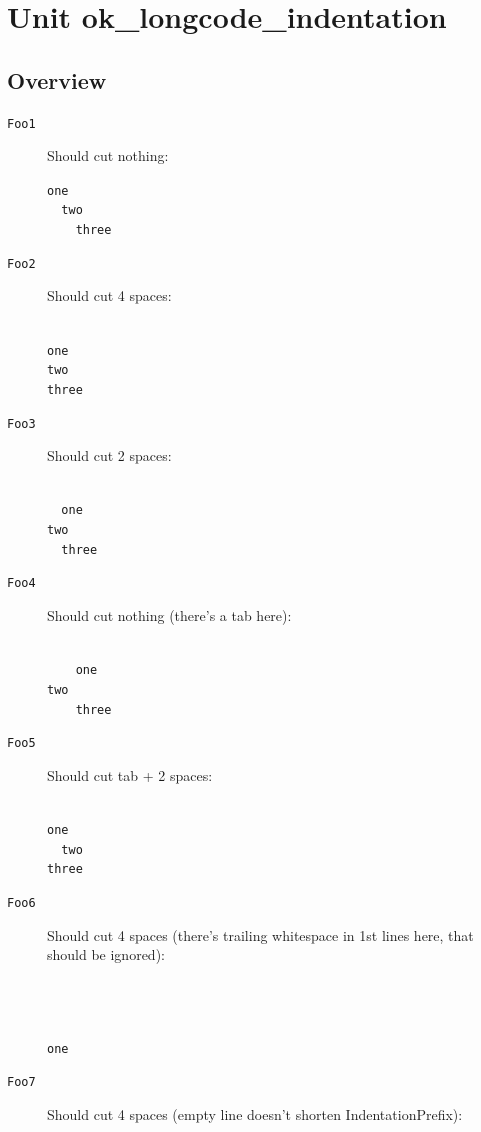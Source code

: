 \documentclass{report}
\begin{document}
\newlength{\tmplength}
\chapter{Unit ok{\_}longcode{\_}indentation}
\section{Overview}
\begin{description}
\item[\texttt{Foo1}]Should cut nothing:

\texttt{one\\\nopagebreak[3]
~~two\\\nopagebreak[3]
~~~~three\\
}
\item[\texttt{Foo2}]Should cut 4 spaces:

\texttt{\\\nopagebreak[3]
one\\\nopagebreak[3]
two\\\nopagebreak[3]
three\\
}
\item[\texttt{Foo3}]Should cut 2 spaces:

\texttt{\\\nopagebreak[3]
~~one\\\nopagebreak[3]
two\\\nopagebreak[3]
~~three\\
}
\item[\texttt{Foo4}]Should cut nothing (there's a tab here):

\texttt{\\\nopagebreak[3]
~~~~one\\\nopagebreak[3]
	two\\\nopagebreak[3]
~~~~three\\
}
\item[\texttt{Foo5}]Should cut tab + 2 spaces:

\texttt{\\\nopagebreak[3]
one\\\nopagebreak[3]
~~two\\\nopagebreak[3]
three\\
}
\item[\texttt{Foo6}]Should cut 4 spaces (there's trailing whitespace in 1st lines here, that should be ignored):

\texttt{\\\nopagebreak[3]
~~~~~~~~~~~~~~~~~\\\nopagebreak[3]
~~~~~~~~~~~~~~~~~~\\\nopagebreak[3]
one\\
}
\item[\texttt{Foo7}]Should cut 4 spaces (empty line doesn't shorten IndentationPrefix):


\end{description}
\end{document}
